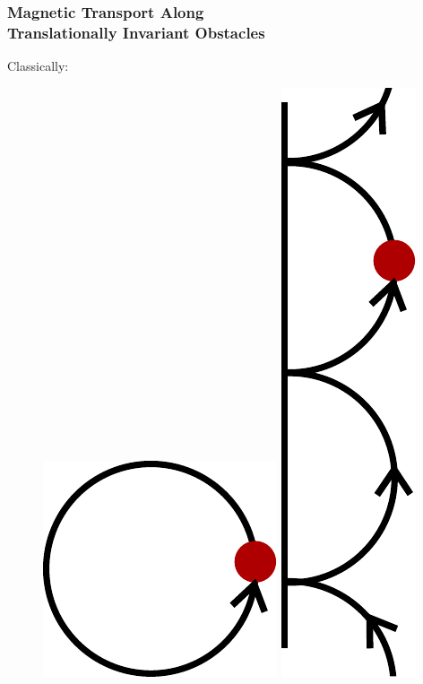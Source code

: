 \documentclass{beamer}
\begin{document}
\begin{frame}
    \frametitle{Magnetic Transport \color{gray} Along \\ Translationally Invariant Obstacles}
    \pause
    Classically:
    \begin{figure}
        \centering
        \includegraphics[scale=.5,align=c]{magnetic_localized.pdf}
        \hspace{2cm}
        \pause
        \includegraphics[scale=.5,align=c]{magnetic_skipping.pdf}

\end{figure}
\end{frame}
\end{document}
